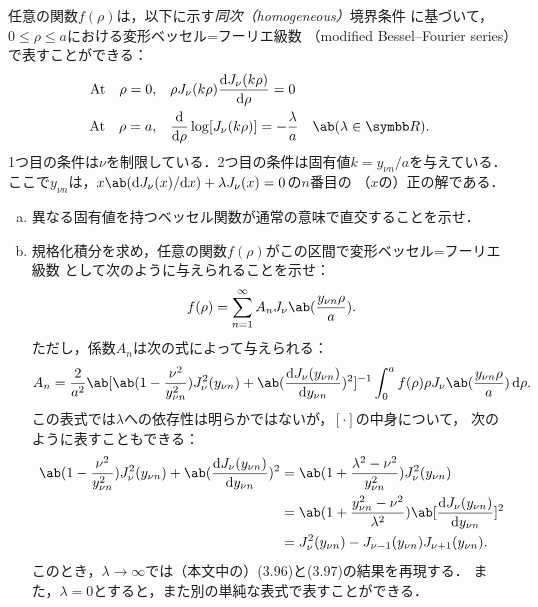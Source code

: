 \begin{bx1}
  任意の関数$f(\rho)$は，以下に示す\emph{同次（homogeneous）}境界条件
  に基づいて，$0 \leq \rho \leq a$における変形ベッセル=フーリエ級数
  （modified Bessel--Fourier series）で表すことができる：
  \begin{align}%
    \text{At} \qq \rho = 0, &\qq \rho J_{\nu}(k\rho) \diff{J_\nu(k\rho)}{\rho} = 0\\
    \text{At} \qq \rho = a, &\qq \diff**{\rho}{\log[J_\nu(k\rho)]} = -\frac{\lambda}{a} \qq \ab(\lambda \in \R).
  \end{align}%
  1つ目の条件は$\nu$を制限している．2つ目の条件は固有値$k = y_{\nu n}/a$を与えている．
  ここで$y_{\nu n}$は，$x \ab(\difs{J_\nu(x)}{x}) + \lambda J_\nu(x) = 0$の$n$番目の
  （$x$の）正の解である．
  \begin{enumerate}[(a)]%
    \item
      異なる固有値を持つベッセル関数が通常の意味で直交することを示せ．
    \item
      規格化積分を求め，任意の関数$f(\rho)$がこの区間で変形ベッセル=フーリエ級数
      として次のように与えられることを示せ：
      \begin{gather}%
        f(\rho) = \sum_{n=1}^\infty A_n J_\nu\ab(\frac{y_{\nu n} \rho}{a}).
      \end{gather}%
      ただし，係数$A_n$は次の式によって与えられる：
      \begin{gather}%
        A_n = \frac{2}{a^2}\ab[
          \ab(1-\frac{\nu^2}{y_{\nu n}^2})J_\nu^2(y_{\nu n}) + \ab(
          \diff{J_\nu(y_{\nu n})}{y_{\nu n}}
          )^2
        ]^{-1}
        \int_0^a f(\rho) \rho J_\nu\ab(\frac{y_{\nu n}\rho}{a})\dl{\rho}.
      \end{gather}%
      この表式では$\lambda$への依存性は明らかではないが，$[\cdot]$の中身について，
      次のように表すこともできる：
      \begin{align}%
        \ab(1-\frac{\nu^2}{y_{\nu n}^2})J_\nu^2(y_{\nu n}) + \ab(
        \diff{J_\nu(y_{\nu n})}{y_{\nu n}}
        )^2
        & = 
        \ab(1+\frac{\lambda^2 - \nu^2}{y_{\nu n}^2}) J_\nu^2(y_{\nu n})\\
        &= \ab(1 + \frac{y_{\nu n}^2 - \nu^2}{\lambda^2}) \ab[\diff{J_\nu(y_{\nu n})}{y_{\nu n}}]^2\\
        &= J_\nu^2(y_{\nu n}) - J_{\nu - 1}(y_{\nu n}) J_{\nu+1}(y_{\nu n}).
      \end{align}%
      このとき，$\lambda\to\infty$では（本文中の）(3.96)と(3.97)の結果を再現する．
      また，$\lambda = 0$とすると，また別の単純な表式で表すことができる．
  \end{enumerate}%
\end{bx1}


\clearpage
